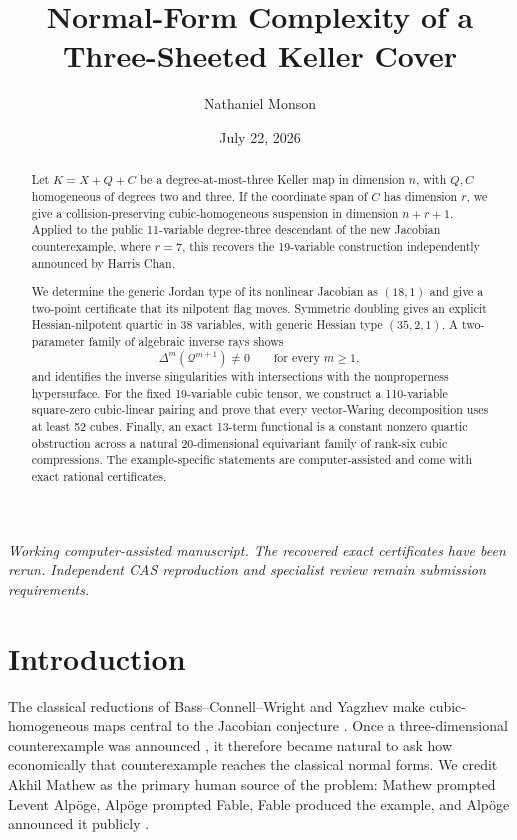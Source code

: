 \documentclass[11pt,reqno]{amsart}
\title[Normal-form complexity]{Normal-Form Complexity of a Three-Sheeted
Keller Cover}
\author{Nathaniel Monson}
\date{July 22, 2026}
\begin{document}
\begin{abstract}
Let \(K=X+Q+C\) be a degree-at-most-three Keller map in dimension \(n\),
with \(Q,C\) homogeneous of degrees two and three.  If the coordinate span of
\(C\) has dimension \(r\), we give a collision-preserving cubic-homogeneous
suspension in dimension \(n+r+1\).  Applied to the public 11-variable
degree-three descendant of the new Jacobian counterexample, where \(r=7\),
this recovers the 19-variable construction independently announced by Harris
Chan.

We determine the generic Jordan type of its nonlinear Jacobian as
\((18,1)\) and give a two-point certificate that its nilpotent flag moves.
Symmetric doubling gives an explicit Hessian-nilpotent quartic in 38
variables, with generic Hessian type \((35,2,1)\).  A two-parameter family
of algebraic inverse rays shows
\[
\Delta^m(\mathcal Q^{m+1})\ne0
\qquad\text{for every }m\ge1,
\]
and identifies the inverse singularities with intersections with the
nonproperness hypersurface.
For the fixed 19-variable cubic tensor, we construct a 110-variable
square-zero cubic-linear pairing and prove that every vector-Waring
decomposition uses at least 52 cubes.  Finally, an exact 13-term functional
is a constant nonzero quartic obstruction across a natural
20-dimensional equivariant family of rank-six cubic compressions.  The
example-specific statements are computer-assisted and come with exact
rational certificates.
\end{abstract}

\maketitle

\begin{center}
\small\emph{Working computer-assisted manuscript.  The recovered exact
certificates have been rerun.  Independent CAS reproduction and specialist
review remain submission requirements.}
\end{center}

\section{Introduction}
\label{sec:introduction}

The classical reductions of Bass--Connell--Wright and Yagzhev make
cubic-homogeneous maps central to the Jacobian conjecture
\cite{bassConnellWright1982}.  Once a three-dimensional counterexample was
announced \cite{alpoge2026announcement}, it therefore became natural to ask
how economically that counterexample reaches the classical normal forms.
We credit Akhil Mathew as the primary human source of the problem: Mathew
prompted Levent Alp\"oge, Alp\"oge prompted Fable, Fable produced the
example, and Alp\"oge announced it publicly
\cite{ulam2026counterexample}.
\end{document}
